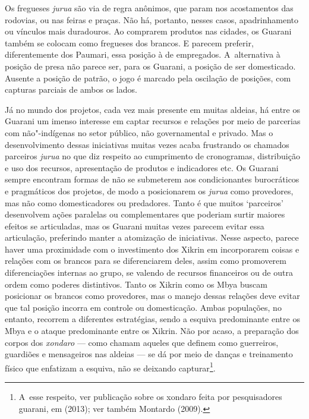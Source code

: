 Os fregueses \emph{jurua} são via de regra anônimos, que param nos acostamentos
das rodovias, ou nas feiras e praças. Não há, portanto, nesses casos,
apadrinhamento ou vínculos mais duradouros. Ao comprarem produtos nas
cidades, os Guarani também se colocam como fregueses dos brancos. E
parecem preferir, diferentemente dos Paumari, essa posição à de
empregados. A~alternativa à posição de presa não parece ser, para os
Guarani, a posição de ser domesticado. Ausente a posição de patrão, o
jogo é marcado pela oscilação de posições, com capturas parciais de
ambos os lados.

Já no mundo dos projetos, cada vez mais presente em muitas aldeias, há
entre os Guarani um imenso interesse em captar recursos e relações por
meio de parcerias com não"-indígenas no setor público, não governamental
e privado. Mas o desenvolvimento dessas iniciativas muitas vezes acaba
frustrando os chamados parceiros \emph{jurua} no que diz respeito ao
cumprimento de cronogramas, distribuição e uso dos recursos,
apresentação de produtos e indicadores etc. Os Guarani sempre encontram
formas de não se submeterem aos condicionantes burocráticos e
pragmáticos dos projetos, de modo a posicionarem os \emph{jurua} como
provedores, mas não como domesticadores ou predadores. Tanto é que
muitos `parceiros' desenvolvem ações paralelas ou complementares que
poderiam surtir maiores efeitos se articuladas, mas os Guarani muitas
vezes parecem evitar essa articulação, preferindo manter a atomização
de iniciativas. Nesse aspecto, parece haver uma proximidade com o
investimento dos Xikrin em incorporarem coisas e relações com os
brancos para se diferenciarem deles, assim como promoverem
diferenciações internas ao grupo, se valendo de recursos financeiros ou
de outra ordem como poderes distintivos. Tanto os Xikrin como os Mbya
buscam posicionar os brancos como provedores, mas o manejo dessas
relações deve evitar que tal posição incorra em controle ou
domesticação. Ambas populações, no entanto, recorrem a diferentes
estratégias, sendo a esquiva predominante entre os Mbya e o ataque
predominante entre os Xikrin. Não por acaso, a preparação dos corpos
dos \emph{xondaro} --- como chamam aqueles que definem como guerreiros,
guardiões e mensageiros nas aldeias --- se dá por meio de danças e
treinamento físico que enfatizam a esquiva, não se deixando
capturar\footnote{A~esse respeito, ver publicação sobre os xondaro
feita por pesquisadores guarani, em  (2013); ver também Montardo
(2009).}.

